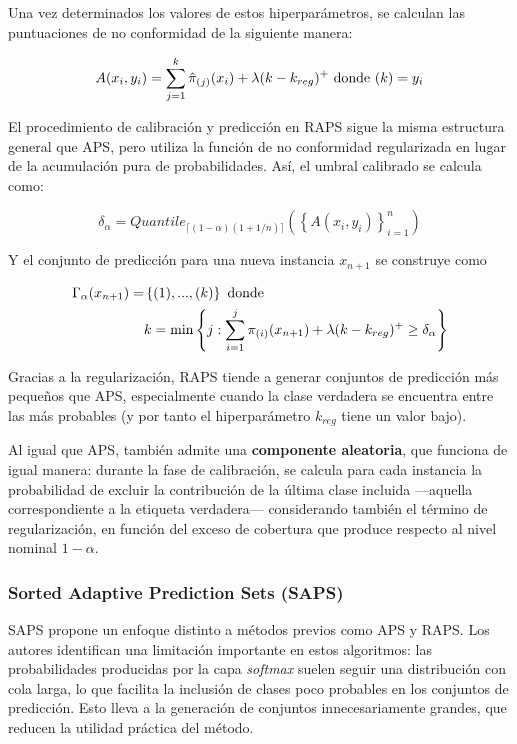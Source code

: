 Una vez determinados los valores de estos hiperparámetros, se calculan las puntuaciones de no conformidad de la siguiente manera:

$$
A(x_i, y_i) = \sum_{j=1}^k \hat{\pi}_{(j)}(x_i) + \lambda (k-k_{reg})^+ \textnormal{ donde } (k) = y_i
$$

El procedimiento de calibración y predicción en RAPS sigue la misma estructura general que APS, pero utiliza la función de no conformidad regularizada en lugar de la acumulación pura de probabilidades. Así, el umbral calibrado se calcula como:

$$
\delta_\alpha = Quantile_{ \lceil  (1-\alpha) (1 + 1/n)  \rceil } \left( \left\{ A(x_i,y_i) \right\}_{i=1}^n \right)
$$

Y el conjunto de predicción para una nueva instancia $x_{n+1}$ se construye como

\begin{align*} 
\Gamma_\alpha(x_{n+1})= &\left\{ (1), ..., (k) \right\} \textnormal{ donde }\\
& k = \min \left\{ j: \sum_{i=1}^{j} \pi_{(i)}(x_{n+1}) + \lambda (k-k_{reg})^+  \ge \delta_\alpha \right\}
\end{align*}

Gracias a la regularización, RAPS tiende a generar conjuntos de predicción más pequeños que APS, especialmente cuando la clase verdadera se encuentra entre las más probables (y por tanto el hiperparámetro $k_{reg}$ tiene un valor bajo).

Al igual que APS, también admite una \textbf{componente aleatoria}, que funciona de igual manera: durante la fase de calibración, se calcula para cada instancia la probabilidad de excluir la contribución de la última clase incluida ---aquella correspondiente a la etiqueta verdadera--- considerando también el término de regularización, en función del exceso de cobertura que produce respecto al nivel nominal $1-\alpha$.


\subsubsection{Sorted Adaptive Prediction Sets (SAPS)}

SAPS \cite{huang2023conformal} propone un enfoque distinto a métodos previos como APS y RAPS. Los autores identifican una limitación importante en estos algoritmos: las probabilidades producidas por la capa \textit{softmax} suelen seguir una distribución con cola larga, lo que facilita la inclusión de clases poco probables en los conjuntos de predicción. Esto lleva a la generación de conjuntos innecesariamente grandes, que reducen la utilidad práctica del método.


